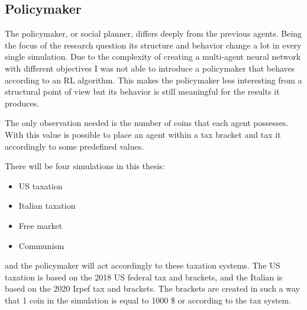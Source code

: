 \subsection{Policymaker}

The policymaker, or social planner, differs deeply from the previous agents. Being the focus of the research question its structure and behavior change a lot in every single simulation. Due to the complexity of creating a multi-agent neural network with different objectives I was not able to introduce a policymaker that behaves according to an RL algorithm. This makes the policymaker less interesting from a structural point of view but its behavior is still meaningful for the results it produces.

The only observation needed is the number of coins that each agent possesses. With this value is possible to place an agent within a tax bracket and tax it accordingly to some predefined values. 

There will be four simulations in this thesis: 

\begin{itemize}
    \item US taxation
    \item Italian taxation
    \item Free market
    \item Communism
\end{itemize}

and the policymaker will act accordingly to these taxation systems. The US taxation is based on the 2018 US federal tax and brackets, and the Italian is based on the 2020 Irpef tax and brackets. The brackets are created in such a way that 1 coin in the simulation is equal to 1000 \$ or   according to the tax system.  